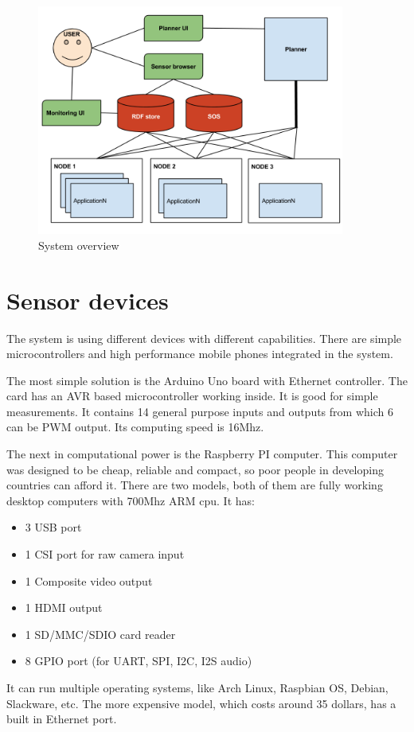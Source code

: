 \begin{figure}[h]
	\centering
	\includegraphics[width=0.9\textwidth]{figures/sysarch.png}
	\caption{System overview\label{fig:sysover}}
\end{figure}

\section{Sensor devices}
The system is using different devices with different capabilities. There are simple microcontrollers and high performance mobile phones integrated in the system. 

The most simple solution is the Arduino Uno board with Ethernet controller. The card has an AVR based microcontroller working inside. It is good for simple measurements. It contains 14 general purpose inputs and outputs from which 6 can be PWM output. Its computing speed is 16Mhz.

The next in computational power is the Raspberry PI computer. This computer was designed to be cheap, reliable and compact, so poor people in developing countries can afford it. There are two models, both of them are fully working desktop computers with 700Mhz ARM cpu. It has:
\begin{itemize}
	\item 3 USB port
	\item 1 CSI port for raw camera input
	\item 1 Composite video output
	\item 1 HDMI output
	\item 1 SD/MMC/SDIO card reader
	\item 8 GPIO port (for UART, SPI, I2C, I2S audio)
\end{itemize} 
 It can run multiple operating systems, like Arch Linux, Raspbian OS, Debian, Slackware, etc. The more expensive model, which costs around 35 dollars, has a built in Ethernet port.  

